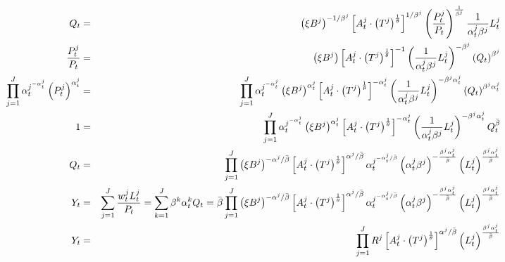 \documentclass{article}
\begin{document}
\begin{eqnarray*}
Q_{t} &=&\left( \xi B^{j}\right) ^{-1/\beta ^{j}}\left[ A_{t}^{j}\cdot
\left( T^{j}\right) ^{\frac{1}{\theta }}\right] ^{1/\beta ^{j}}\left( \frac{%
P_{t}^{j}}{P_{t}}\right) ^{\frac{1}{\beta ^{j}}}\frac{1}{\alpha
_{t}^{j}\beta ^{j}}L_{t}^{j} \\
\frac{P_{t}^{j}}{P_{t}} &=&\left( \xi B^{j}\right) \left[ A_{t}^{j}\cdot
\left( T^{j}\right) ^{\frac{1}{\theta }}\right] ^{-1}\left( \frac{1}{\alpha
_{t}^{j}\beta ^{j}}L_{t}^{j}\right) ^{-\beta ^{j}}\left( Q_{t}\right)
^{\beta ^{j}} \\
\prod_{j=1}^{J}\alpha _{t}^{j^{-\alpha _{t}^{j}}}\left( P_{t}^{j}\right)
^{\alpha _{t}^{j}} &=&\prod_{j=1}^{J}\alpha _{t}^{j^{-\alpha
_{t}^{j}}}\left( \xi B^{j}\right) ^{\alpha _{t}^{j}}\left[ A_{t}^{j}\cdot
\left( T^{j}\right) ^{\frac{1}{\theta }}\right] ^{-\alpha _{t}^{j}}\left( 
\frac{1}{\alpha _{t}^{j}\beta ^{j}}L_{t}^{j}\right) ^{-\beta ^{j}\alpha
_{t}^{j}}\left( Q_{t}\right) ^{\beta ^{j}\alpha _{t}^{j}} \\
1 &=&\prod_{j=1}^{J}\alpha _{t}^{j^{-\alpha _{t}^{j}}}\left( \xi
B^{j}\right) ^{\alpha _{t}^{j}}\left[ A_{t}^{j}\cdot \left( T^{j}\right) ^{%
\frac{1}{\theta }}\right] ^{-\alpha _{t}^{j}}\left( \frac{1}{\alpha
_{t}^{j}\beta ^{j}}L_{t}^{j}\right) ^{-\beta ^{j}\alpha _{t}^{j}}Q_{t}^{\bar{%
\beta}} \\
Q_{t} &=&\prod_{j=1}^{J}\left( \xi B^{j}\right) ^{-\alpha ^{j}/\bar{\beta}}%
\left[ A_{t}^{j}\cdot \left( T^{j}\right) ^{\frac{1}{\theta }}\right]
^{\alpha ^{j}/\bar{\beta}}\alpha _{t}^{j^{-\alpha _{t}^{j}/\bar{\beta}%
}}\left( \alpha _{t}^{j}\beta ^{j}\right) ^{-\frac{\beta ^{j}\alpha _{t}^{j}%
}{\bar{\beta}}}\left( L_{t}^{j}\right) ^{\frac{\beta ^{j}\alpha _{t}^{j}}{%
\bar{\beta}}} \\
Y_{t} &=&\sum_{j=1}^{J}\frac{w_{t}^{j}L_{t}^{j}}{P_{t}}=\sum_{k=1}^{J}\beta
^{k}\alpha _{t}^{k}Q_{t}=\bar{\beta}\prod_{j=1}^{J}\left( \xi B^{j}\right)
^{-\alpha ^{j}/\bar{\beta}}\left[ A_{t}^{j}\cdot \left( T^{j}\right) ^{\frac{%
1}{\theta }}\right] ^{\alpha ^{j}/\bar{\beta}}\alpha _{t}^{j^{-\alpha
_{t}^{j}/\bar{\beta}}}\left( \alpha _{t}^{j}\beta ^{j}\right) ^{-\frac{\beta
^{j}\alpha _{t}^{j}}{\bar{\beta}}}\left( L_{t}^{j}\right) ^{\frac{\beta
^{j}\alpha _{t}^{j}}{\bar{\beta}}} \\
Y_{t} &=&\prod_{j=1}^{J}R^{j}\left[ A_{t}^{j}\cdot \left( T^{j}\right) ^{%
\frac{1}{\theta }}\right] ^{\alpha ^{j}/\bar{\beta}}\left( L_{t}^{j}\right)
^{\frac{\beta ^{j}\alpha _{t}^{j}}{\bar{\beta}}}
\end{eqnarray*}
\end{document}
